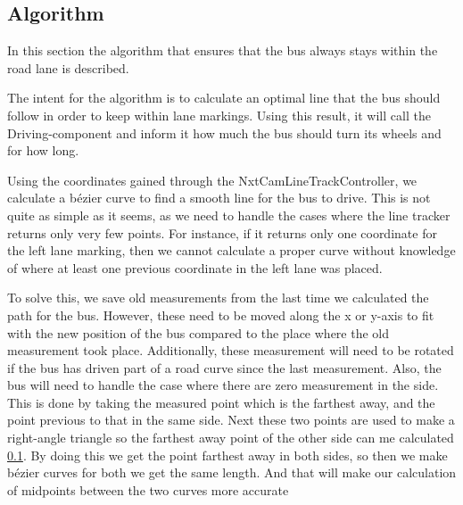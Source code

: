 \subsection{Algorithm}
In this section the algorithm that ensures that the bus always stays within the road lane is described. 

The intent for the algorithm is to calculate an optimal line that the bus should follow in order to keep within lane markings. Using this result, it will call the Driving-component and inform it how much the bus should turn its wheels and for how long. 

Using the coordinates gained through the NxtCamLineTrackController, we calculate a bézier curve to find a smooth line for the bus to drive. This is not quite as simple as it seems, as we need to handle the cases where the line tracker returns only very few points. For instance, if it returns only one coordinate for the left lane marking, then we cannot calculate a proper curve without knowledge of where at least one previous coordinate in the left lane was placed. 

To solve this, we save old measurements from the last time we calculated the path for the bus. However, these need to be moved along the x or y-axis to fit with the new position of the bus compared to the place where the old measurement took place. Additionally, these measurement will need to be rotated if the bus has driven part of a road curve since the last measurement. Also, the bus will need to handle the case where there are zero measurement in the side. This is done by taking the measured point which is the farthest away, and the point previous to that in the same side. Next these two points are used to make a right-angle triangle so the farthest away point of the other side can me calculated \ref{}. By doing this we get the point farthest away in both sides, so then we make bézier curves for both we get the same length. And that will make our calculation of midpoints between the two curves more accurate 







